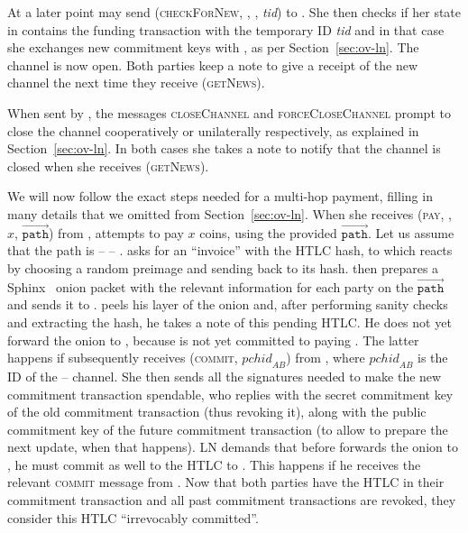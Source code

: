     At a later point \environment{} may send (\textsc{checkForNew}, \alice,
    \bob, \textit{tid}) to \alice. She then checks if her state in \ledger{}
    contains the funding transaction with the temporary ID \textit{tid} and in
    that case she exchanges new commitment keys with \bob, as
    per Section~\ref{sec:ov-ln}. The channel is now open. Both parties keep a
    note to give \environment{} a receipt of the new channel the next time they
    receive (\textsc{getNews}).

    When sent by \environment, the messages \textsc{closeChannel} and
    \textsc{forceCloseChannel} prompt \alice{} to close the channel
    cooperatively or unilaterally respectively, as explained in
    Section~\ref{sec:ov-ln}. In both cases she takes a note to notify
    \environment{} that the channel is closed when she receives
    (\textsc{getNews}).

    We will now follow the exact steps needed for a multi-hop payment,
    filling in many details that we omitted from Section~\ref{sec:ov-ln}. When
    she receives (\textsc{pay}, \charlie, $x$, $\overrightarrow{\mathtt{path}}$)
    from \environment, \alice{} attempts to pay \charlie{} $x$ coins, using the
    provided $\overrightarrow{\mathtt{path}}$. Let us assume that the path is
    \alice{} -- \bob{} -- \charlie. \alice{} asks \charlie{} for an
    ``invoice'' with the HTLC hash, to which \charlie{} reacts
    by choosing a random preimage and sending back to \alice{} its hash.
    \alice{} then prepares a Sphinx~\cite{sphinx} onion packet with the relevant
    information for each party on the $\overrightarrow{\mathtt{path}}$ and sends
    it to \bob{}. \bob{} peels his layer of the onion and, after performing
    sanity checks and extracting the hash, he takes a note of this
    pending HTLC. He does not yet forward the onion to \charlie, because
    \alice{} is not yet committed to paying \bob. The latter happens if \alice{}
    subsequently receives (\textsc{commit}, $\mathit{pchid}_{AB}$) from
    \environment, where $\mathit{pchid}_{AB}$ is the ID of the \alice{}
    -- \bob{} channel. She then sends \bob{} all the signatures needed to make
    the new commitment transaction spendable, who replies with the secret
    commitment key of the old commitment transaction (thus revoking it), along
    with the public commitment key of the future commitment transaction (to
    allow \alice{} to prepare the next update, when that happens). LN demands
    that before \bob{} forwards the onion to \charlie, he must
    commit as well to the HTLC to \alice. This happens if he receives
    the relevant \textsc{commit} message from \environment. Now that both
    parties have the HTLC in their commitment transaction and all past
    commitment transactions are revoked, they consider this HTLC ``irrevocably
    committed''.

